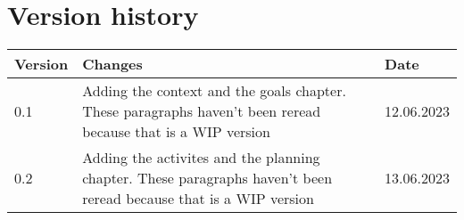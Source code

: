\chapter{Version history}
\label{chap:spec-versions}

\begin{tabular}{|m{}|m{}|m{}|}
 \hline
 \textbf{Version} & \textbf{Changes} & \textbf{Date} \\ [0.5ex]
 \hline
 0.1 & Adding the context and the goals chapter. These paragraphs haven't been reread because that is a WIP version & 12.06.2023  \\
 0.2 & Adding the activites and the planning chapter. These paragraphs haven't been reread because that is a WIP version & 13.06.2023  \\
 \hline
\end{tabular}